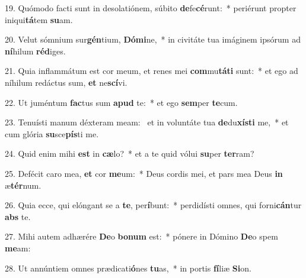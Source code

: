 19. Quómodo facti sunt in desolatiónem, súbito \textbf{de}fe\textbf{cé}runt:~*  periérunt propter iniqui\textbf{tá}tem \textbf{su}am.\

20. Velut sómnium sur\textbf{gén}tium, \textbf{Dó}\textbf{mi}ne,~*  in civitáte tua imáginem ipsórum ad \textbf{ní}hilum \textbf{réd}iges.\

21. Quia inflammátum est cor meum, et renes mei \textbf{com}mu\textbf{tá}\textbf{ti} sunt:~*  et ego ad níhilum redáctus sum, \textbf{et} ne\textbf{scí}vi.\

22. Ut juméntum \textbf{fac}tus sum \textbf{a}\textbf{pud} te:~*  et ego \textbf{sem}per \textbf{te}cum.\

23. Tenuísti manum déxteram meam: \dag\  et in voluntáte tua \textbf{de}du\textbf{xís}\textbf{ti} me,~*  et cum glória \textbf{su}sce\textbf{pís}ti me.\

24. Quid enim mihi \textbf{est} in \textbf{cæ}lo?~*  et a te quid vólui \textbf{su}per \textbf{ter}ram?\

25. Defécit caro mea, \textbf{et} cor \textbf{me}um:~*  Deus cordis mei, et pars mea Deus \textbf{in} æ\textbf{tér}num.\

26. Quia ecce, qui elóngant se a \textbf{te}, per\textbf{í}bunt:~*  perdidísti omnes, qui forni\textbf{cán}tur \textbf{abs} te.\

27. Mihi autem adhærére \textbf{De}o \textbf{bo}\textbf{num} est:~*  pónere in Dómino \textbf{De}o spem \textbf{me}am:\

28. Ut annúntiem omnes prædicati\textbf{ó}nes \textbf{tu}as,~*  in portis \textbf{fí}liæ \textbf{Si}on.\

